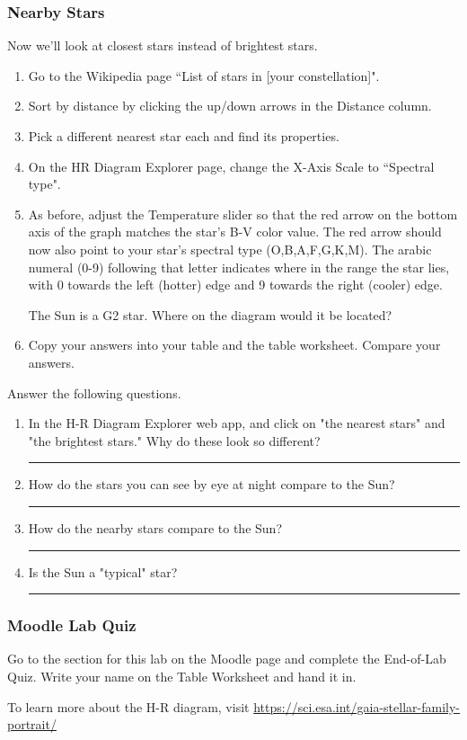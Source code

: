 \documentclass[main.tex]{subfiles}
\begin{document}
\subsubsection{Nearby Stars}
Now we'll look at closest stars instead of brightest stars.
\begin{enumerate}
\item Go to the Wikipedia page ``List of stars in [your constellation]".
\item Sort by distance by clicking the up/down arrows in the Distance column.
\item Pick a different nearest star each and find its properties.
\item On the HR Diagram Explorer page, change the X-Axis Scale to ``Spectral type".
\item As before, adjust the Temperature slider so that the red arrow on the bottom axis of the graph matches the star's B-V color value. The red arrow should now also point to your star's spectral type (O,B,A,F,G,K,M). The arabic numeral (0-9) following that letter indicates where in the range the star lies, with 0 towards the left (hotter) edge and 9 towards the right (cooler) edge.

The Sun is a G2 star. Where on the diagram would it be located?
\item Copy your answers into your table and the table worksheet. Compare your answers.
\end{enumerate}

Answer the following questions.
\begin{enumerate}
\item In the H-R Diagram Explorer web app, and click on "the nearest stars" and "the brightest stars." Why do these look so different?

\rule{15cm}{.15mm}
\item How do the stars you can see by eye at night compare to the Sun?

\rule{15cm}{.15mm}
\item How do the nearby stars compare to the Sun?

\rule{15cm}{.15mm}
\item Is the Sun a "typical" star?

\rule{15cm}{.15mm}
\end{enumerate}

\subsubsection{Moodle Lab Quiz}
Go to the section for this lab on the Moodle page and complete the End-of-Lab Quiz. Write your name on the Table Worksheet and hand it in.

To learn more about the H-R diagram, visit \url{https://sci.esa.int/gaia-stellar-family-portrait/}
\end{document}
